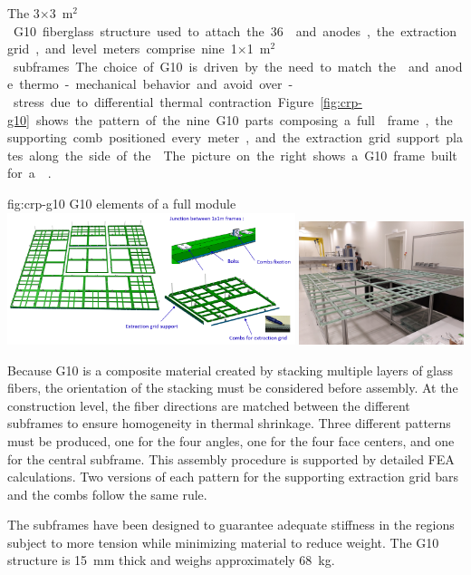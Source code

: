 The \num{3}$\times$\SI{3}{m$^{2}$}  G10 fiberglass structure used to attach the \num{36}  and anodes, the extraction grid, and level meters comprise nine \num{1}$\times$\SI{1}{m$^{2}$} subframes. The choice of G10 is driven by the need to match the  and anode thermo-mechanical behavior and avoid over-stress due to differential thermal contraction. 
Figure~\ref{fig:crp-g10} shows the pattern of the nine G10 parts composing a full  frame, the supporting comb positioned every meter, and the extraction grid support plates along the side of the . The picture on the right shows a G10 frame built for a  .

\begin{dunefigure}{fig:crp-g10}
{G10 elements of a full  module}
\includegraphics[width=0.63\textwidth]{graphics/G10}
\includegraphics[width=0.36\textwidth]{graphics/G10-frameassembled}
\end{dunefigure}

Because G10 is a composite material created by stacking multiple layers of glass fibers, the orientation of the stacking must be considered before assembly.
At the construction level, the fiber directions are matched between the different subframes to ensure homogeneity in thermal shrinkage. Three different patterns must be produced, one for the four angles, one for the four face centers, and one for the central subframe. This assembly procedure is supported by detailed FEA calculations.
Two versions of each pattern for the supporting extraction grid bars and the combs follow the same rule.

The subframes have been designed to guarantee  
adequate stiffness in the  regions subject to more tension while minimizing material to reduce weight.
The G10 structure is \SI{15}{mm} thick and weighs approximately \SI{68}{kg}. 

